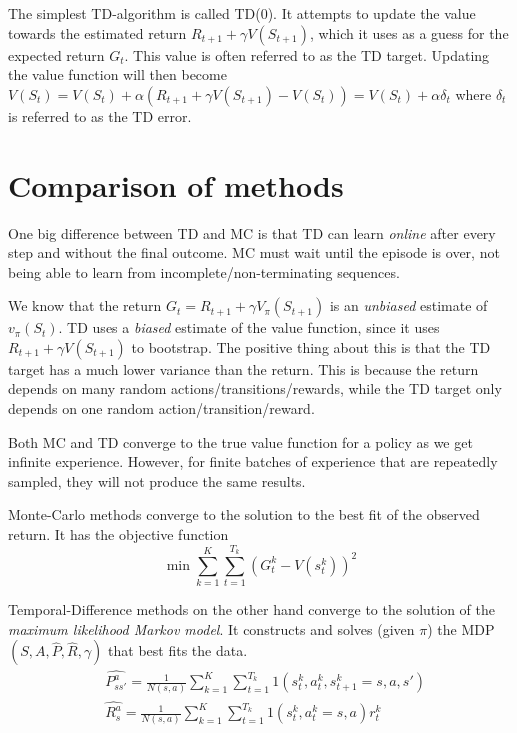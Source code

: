 The simplest TD-algorithm is called TD(0). It attempts to update the value towards the estimated return $R_{t+1} + \gamma V(S_{t+1})$, which it uses as a guess for the expected return $G_t$. This value is often referred to as the TD target. Updating the value function will then become $V(S_t) = V(S_t) + \alpha (R_{t+1} + \gamma V(S_{t+1}) - V(S_t)) = V(S_t) + \alpha \delta_t$ where $\delta_t$ is referred to  as the TD error.

\section{Comparison of methods}

One big difference between TD and MC is that TD can learn \textit{online} after every step and without the final outcome. MC must wait until the episode is over, not being able to learn from incomplete/non-terminating sequences.

We know that the return $G_t = R_{t+1} + \gamma V_\pi(S_{t+1})$ is an \textit{unbiased} estimate of $v_\pi(S_t)$. TD uses a \textit{biased} estimate of the value function, since it uses $R_{t+1} + \gamma V(S_{t+1})$ to bootstrap. The positive thing about this is that the TD target has a much lower variance than the return. This is because the return depends on many random actions/transitions/rewards, while the TD target only depends on one random action/transition/reward.

Both MC and TD converge to the true value function for a policy as we get infinite experience. However, for finite batches of experience that are repeatedly sampled, they will not produce the same results.

Monte-Carlo methods converge to the solution to the best fit of the observed return. It has the objective function
\begin{equation*}
	\min \sum_{k = 1}^K \sum_{t = 1}^{T_k} (G_t^k - V(s_t^k))^2
\end{equation*}

Temporal-Difference methods on the other hand converge to the solution of the \textit{maximum likelihood Markov model}. It constructs and solves (given $\pi$) the MDP $(S, A, \hat{P}, \hat{R}, \gamma)$ that best fits the data.
\begin{equation*}
	\begin{aligned}
		& \hat{P^a_{ss'}} = \frac{1}{N(s,a)} \sum_{k = 1}^K \sum_{t = 1}^{T_k} 1(s^k_t, a^k_t, s^k_{t+1} = s, a, s')\\
		& \hat{R^a_{s}} = \frac{1}{N(s,a)} \sum_{k = 1}^K \sum_{t = 1}^{T_k} 1(s^k_t, a^k_t = s, a)r^k_t
	\end{aligned}
\end{equation*}

